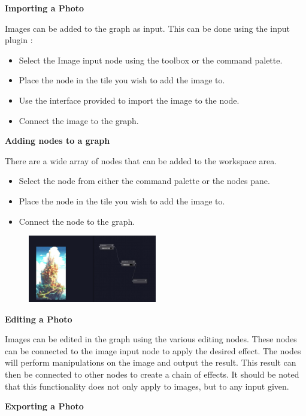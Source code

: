 \documentclass[11pt,a4paper]{article}
\begin{document}
\textbf{Importing a Photo}

Images can be added to the graph as input. This can be done using the input plugin : 
\begin{itemize}
  \item[\textbullet] Select the Image input node using the toolbox or the command palette.
  \item[\textbullet] Place the node in the tile you wish to add the image to.
  \item[\textbullet] Use the interface provided to import the image to the node.
  \item[\textbullet] Connect the image to the graph.
\end{itemize}

\textbf{Adding nodes to a graph}

There are a wide array of nodes that can be added to the workspace area.
\begin{itemize}
  \item[\textbullet] Select the node from either the command palette or the nodes pane.
  \item[\textbullet] Place the node in the tile you wish to add the image to.
  \item[\textbullet] Connect the node to the graph.
\end{itemize}

\begin{figure}[H]
  \centering
  \href{https://www.youtube.com/watch?v=ak3Bto3phqk}
  {\includegraphics[width=0.5\textwidth]{../pics/nodes.png}}
\end{figure}


\textbf{Editing a Photo}

Images can be edited in the graph using the various editing nodes. These nodes can be connected to the image input node to apply the desired effect.
The nodes will perform manipulations on the image and output the result. This result can then be connected to other nodes to create a chain of effects.
It should be noted that this functionality does not only apply to images, but to any input given.

\textbf{Exporting a Photo}
\end{document}
